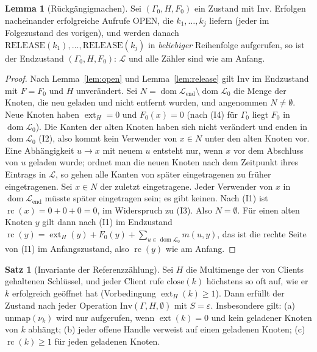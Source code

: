\documentclass[a4paper,12pt,twoside]{report}
\DeclareRobustCommand{\_}{\ifmmode\mbox{\textunderscore}\else\textunderscore\allowbreak{}\fi}
\theoremstyle{definition}
\newtheorem{satz}{Satz}[chapter]
\newtheorem{lemma}{Lemma}[chapter]
\newcommand{\dom}{\operatorname{dom}}
\newcommand{\ext}{\operatorname{ext}}
\newcommand{\rc}{\operatorname{rc}}
\begin{document}
\begin{lemma}[Rückgängigmachen]
	\label{lem:undo}
	Sei $(\Gamma_0,H,F_0)$ ein Zustand mit $\mathrm{Inv}$. Erfolgen nacheinander erfolgreiche Aufrufe OPEN, die $k_1,\ldots,k_j$ liefern (jeder im Folgezustand des vorigen), und werden danach $\mathrm{RELEASE}(k_1),\ldots,\mathrm{RELEASE}(k_j)$ in \emph{beliebiger} Reihenfolge aufgerufen, so ist der Endzustand $(\Gamma_0,H,F_0)$: $\mathcal L$ und alle Zähler sind wie am Anfang.
\end{lemma}

\begin{proof}
	Nach Lemma~\ref{lem:open} und Lemma~\ref{lem:release} gilt $\mathrm{Inv}$ im Endzustand mit $F=F_0$ und $H$ unverändert. Sei $N=\dom\mathcal L_{\mathrm{end}}\setminus\dom\mathcal L_0$ die Menge der Knoten, die neu geladen und nicht entfernt wurden, und angenommen $N\ne\emptyset$. Neue Knoten haben $\ext_H=0$ und $F_0(x)=0$ (nach (I4) für $\Gamma_0$ liegt $F_0$ in $\dom\mathcal L_0$). Die Kanten der alten Knoten haben sich nicht verändert und enden in $\dom\mathcal L_0$ (I2), also kommt kein Verwender von $x\in N$ unter den alten Knoten vor. Eine Abhängigkeit $u\to x$ mit neuem $u$ entsteht nur, wenn $x$ vor dem Abschluss von $u$ geladen wurde; ordnet man die neuen Knoten nach dem Zeitpunkt ihres Eintrags in $\mathcal L$, so gehen alle Kanten von später eingetragenen zu früher eingetragenen. Sei $x\in N$ der zuletzt eingetragene. Jeder Verwender von $x$ in $\dom\mathcal L_{\mathrm{end}}$ müsste später eingetragen sein; es gibt keinen. Nach (I1) ist $\rc(x)=0+0+0=0$, im Widerspruch zu (I3). Also $N=\emptyset$. Für einen alten Knoten $y$ gilt dann nach (I1) im Endzustand $\rc(y)=\ext_H(y)+F_0(y)+\sum_{u\in\dom\mathcal L_0}m(u,y)$, das ist die rechte Seite von (I1) im Anfangszustand, also $\rc(y)$ wie am Anfang.
\end{proof}

\begin{satz}[Invariante der Referenzzählung]
	\label{satz:refcount}
	Sei $H$ die Multimenge der von Clients gehaltenen Schlüssel, und jeder Client rufe $\mathrm{close}(k)$ höchstens so oft auf, wie er $k$ erfolgreich geöffnet hat (Vorbedingung $\ext_H(k)\ge1$). Dann erfüllt der Zustand nach jeder Operation $\mathrm{Inv}(\Gamma,H,\emptyset)$ mit $S=\varepsilon$. Insbesondere gilt: (a) $\mathrm{unmap}(\nu_k)$ wird nur aufgerufen, wenn $\ext(k)=0$ und kein geladener Knoten von $k$ abhängt; (b) jeder offene Handle verweist auf einen geladenen Knoten; (c) $\rc(k)\ge1$ für jeden geladenen Knoten.
\end{satz}
\end{document}
